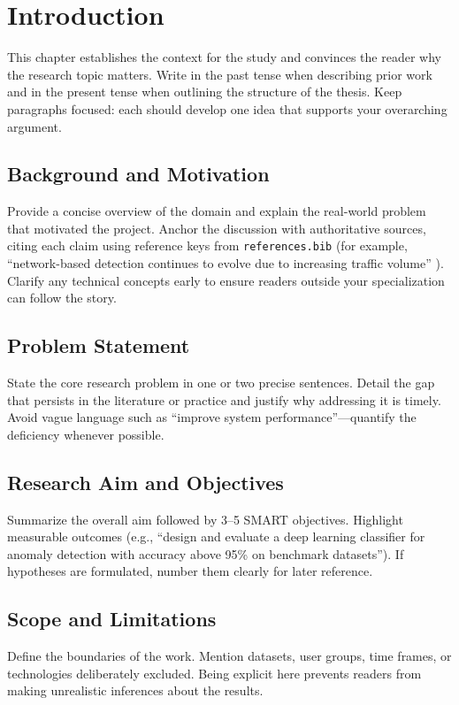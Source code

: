 \section{Introduction}
\label{sec:introduction}

\noindent This chapter establishes the context for the study and convinces the reader why
the research topic matters. Write in the past tense when describing prior work and
in the present tense when outlining the structure of the thesis. Keep paragraphs
focused: each should develop one idea that supports your overarching argument.

\subsection{Background and Motivation}
Provide a concise overview of the domain and explain the real-world problem
that motivated the project. Anchor the discussion with authoritative sources,
citing each claim using reference keys from \texttt{references.bib} (for
example, ``network-based detection continues to evolve due to increasing
traffic volume'' \citep{Abdullateef2019}). Clarify any technical concepts early
to ensure readers outside your specialization can follow the story.

\subsection{Problem Statement}
State the core research problem in one or two precise sentences. Detail the gap
that persists in the literature or practice and justify why addressing it is
timely. Avoid vague language such as ``improve system performance''—quantify
the deficiency whenever possible.

\subsection{Research Aim and Objectives}
Summarize the overall aim followed by 3--5 SMART objectives. Highlight
measurable outcomes (e.g., ``design and evaluate a deep learning classifier for
anomaly detection with accuracy above 95\% on benchmark datasets''). If
hypotheses are formulated, number them clearly for later reference.

\subsection{Scope and Limitations}
Define the boundaries of the work. Mention datasets, user groups, time frames,
or technologies deliberately excluded. Being explicit here prevents readers
from making unrealistic inferences about the results.

